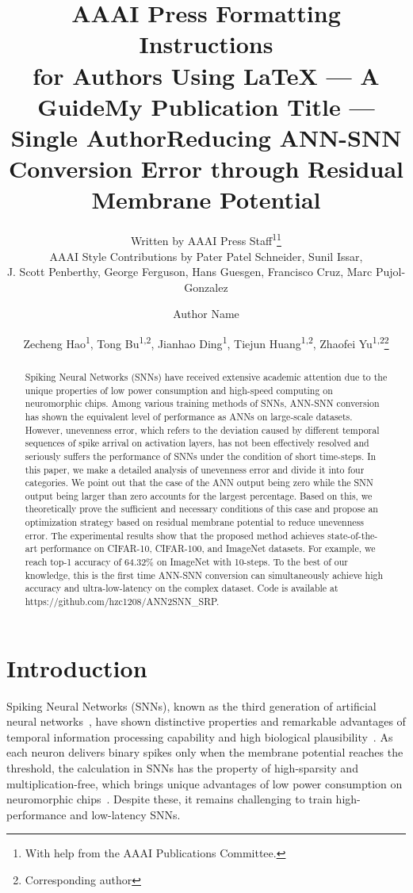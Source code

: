 \documentclass[letterpaper]{article} %
\title{AAAI Press Formatting Instructions \\for Authors Using \LaTeX{} --- A Guide}
\author{
    Written by AAAI Press Staff\textsuperscript{\rm 1}\thanks{With help from the AAAI Publications Committee.}\\
    AAAI Style Contributions by Pater Patel Schneider,
    Sunil Issar,\\
    J. Scott Penberthy,
    George Ferguson,
    Hans Guesgen,
    Francisco Cruz\equalcontrib,
    Marc Pujol-Gonzalez\equalcontrib
}
\title{My Publication Title --- Single Author}
\author {
    Author Name
}
\title{Reducing ANN-SNN Conversion Error through Residual Membrane Potential}
\author {
    Zecheng Hao\textsuperscript{\rm 1},
    Tong Bu\textsuperscript{\rm 1,\rm 2},
    Jianhao Ding\textsuperscript{\rm 1},
    Tiejun Huang\textsuperscript{\rm 1,\rm 2},
    Zhaofei Yu\textsuperscript{\rm 1,\rm 2}\thanks{Corresponding author}
}
\begin{document}
\maketitle


\begin{abstract}
Spiking Neural Networks (SNNs) have received extensive academic attention due to the unique properties of low power consumption and high-speed computing on neuromorphic chips. Among various training methods of SNNs, ANN-SNN conversion has shown the equivalent level of performance as ANNs on large-scale datasets. However, unevenness error, which refers to the deviation caused by different temporal sequences of spike arrival on activation layers, has not been effectively resolved and seriously suffers the performance of SNNs under the condition of short time-steps. In this paper, we make a detailed analysis of unevenness error and divide it into four categories. We point out that the case of the ANN output being zero while the SNN output being larger than zero accounts for the largest percentage. Based on this, we theoretically prove the sufficient and necessary conditions of this case and propose an optimization strategy based on residual membrane potential to reduce unevenness error. The experimental results show that the proposed method achieves state-of-the-art performance on CIFAR-10, CIFAR-100, and ImageNet datasets. For example, we reach top-1 accuracy of 64.32\% on ImageNet with 10-steps. To the best of our knowledge, this is the first time ANN-SNN conversion can simultaneously achieve high accuracy and ultra-low-latency on the complex dataset. Code is available at https://github.com/hzc1208/ANN2SNN\_SRP.


\end{abstract}

\section{Introduction}
Spiking Neural Networks (SNNs), known as the third generation of artificial neural networks~\cite{Wolfgang1997}, have shown distinctive properties and remarkable advantages of temporal information processing capability and high biological plausibility~\cite{roy2019towards}. As each neuron delivers binary spikes only when the membrane potential reaches the threshold, the calculation in SNNs has the property of high-sparsity and multiplication-free, which brings unique advantages of low power consumption on neuromorphic chips~\cite{schemmel2010wafer,furber2012overview,merolla2014million,davies2018loihi,pei2019towards,debole2019truenorth}.
Despite these, it remains challenging to train high-performance and low-latency SNNs.
\end{document}
